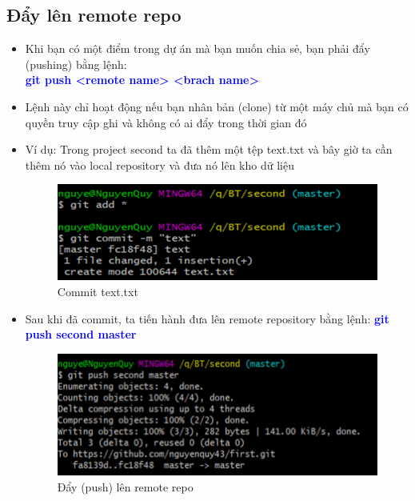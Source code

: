 \documentclass[12pt,a4paper]{report}
\begin{document}
\subsection{Đẩy lên remote repo}
\begin{itemize}
\item Khi bạn có một điểm trong dự án mà bạn muốn chia sẻ, bạn phải đẩy (pushing) bằng lệnh:\\ \textcolor{blue}{\bf git push <remote name> <brach name> }
\item Lệnh này chỉ hoạt động nếu bạn nhân bản (clone) từ một máy chủ mà bạn có quyền truy cập ghi và không có ai đẩy trong thời gian đó
\item Ví dụ: Trong project second ta đã thêm một tệp text.txt và bây giờ ta cần thêm nó vào local repository và đưa nó lên kho dữ liệu

\begin{figure}[!ht]
	\centering
	\includegraphics[width=0.8\linewidth]{screenshot038}
\caption{Commit text.txt}
	\label{fig:screenshot038}
\end{figure}

\item Sau khi đã commit, ta tiến hành đưa lên remote repository bằng lệnh: \textcolor{blue}{\bf git push second master}

\begin{figure}[!ht]
	\centering
	\includegraphics[width=0.8\linewidth]{screenshot039}
\caption{Đẩy (push) lên remote repo}
	\label{fig:screenshot039}
	\end{figure}
\end{itemize}	
\end{document}
